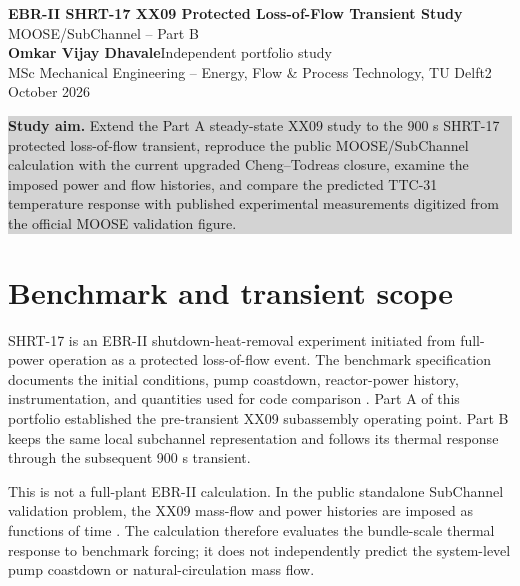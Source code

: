 \documentclass[10pt,a4paper]{article}
\begin{document}
{\Large\bfseries\color{accent} EBR-II SHRT-17 XX09 Protected Loss-of-Flow Transient Study}\\[-1mm]
{\large MOOSE/SubChannel -- Part B}\\[2mm]
{\bfseries Omkar Vijay Dhavale}\hfill Independent portfolio study\\
MSc Mechanical Engineering -- Energy, Flow \& Process Technology, TU Delft\hfill 2 October 2026

\vspace{2mm}
\colorbox{lightgray}{\parbox{0.975\linewidth}{\small
\textbf{Study aim.} Extend the Part A steady-state XX09 study to the 900 s SHRT-17 protected loss-of-flow transient, reproduce the public MOOSE/SubChannel calculation with the current upgraded Cheng--Todreas closure, examine the imposed power and flow histories, and compare the predicted TTC-31 temperature response with published experimental measurements digitized from the official MOOSE validation figure.}}

\section{Benchmark and transient scope}

SHRT-17 is an EBR-II shutdown-heat-removal experiment initiated from full-power operation as a protected loss-of-flow event. The benchmark specification documents the initial conditions, pump coastdown, reactor-power history, instrumentation, and quantities used for code comparison \parencite{sumner2012}. Part A of this portfolio established the pre-transient XX09 subassembly operating point. Part B keeps the same local subchannel representation and follows its thermal response through the subsequent 900 s transient.

This is not a full-plant EBR-II calculation. In the public standalone SubChannel validation problem, the XX09 mass-flow and power histories are imposed as functions of time \parencite{moose_ebrii}. The calculation therefore evaluates the bundle-scale thermal response to benchmark forcing; it does not independently predict the system-level pump coastdown or natural-circulation mass flow.
\end{document}

